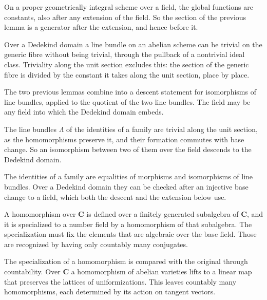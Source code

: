On a proper geometrically integral scheme over a field, the global functions are constants, also after any extension of
the field. So the section of the previous lemma is a generator after the extension, and hence before it.

Over a Dedekind domain a line bundle on an abelian scheme can be trivial on the generic fibre without being trivial,
through the pullback of a nontrivial ideal class. Triviality along the unit section excludes this: the section of the
generic fibre is divided by the constant it takes along the unit section, place by place.

The two previous lemmas combine into a descent statement for isomorphisms of line bundles, applied to the quotient of
the two line bundles. The field may be any field into which the Dedekind domain embeds.

The line bundles $\Lambda$ of the identities of a family are trivial along the unit section, as the homomorphisms
preserve it, and their formation commutes with base change. So an isomorphism between two of them over the field
descends to the Dedekind domain.

The identities of a family are equalities of morphisms and isomorphisms of line bundles. Over a Dedekind domain they
can be checked after an injective base change to a field, which both the descent and the extension below use.

A homomorphism over $\mathbf C$ is defined over a finitely generated subalgebra of $\mathbf C$, and it is specialized to
a number field by a homomorphism of that subalgebra. The specialization must fix the elements that are algebraic over the
base field. Those are recognized by having only countably many conjugates.

The specialization of a homomorphism is compared with the original through countability. Over $\mathbf C$ a
homomorphism of abelian varieties lifts to a linear map that preserves the lattices of uniformizations. This leaves
countably many homomorphisms, each determined by its action on tangent vectors.

